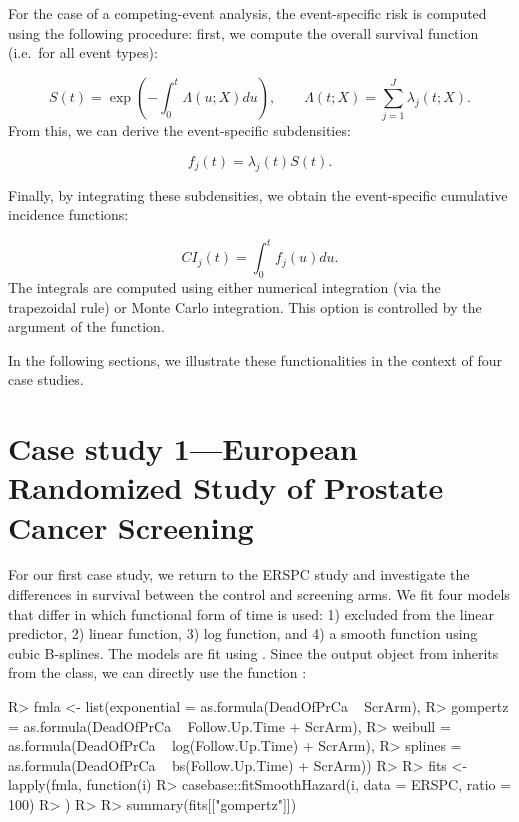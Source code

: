\documentclass[
]{jss}
\begin{document}
For the case of a competing-event analysis, the event-specific risk is
computed using the following procedure: first, we compute the overall
survival function (i.e.~for all event types):

\[ S(t) = \exp\left(-\int_0^t \Lambda(u;X) du\right),\qquad \Lambda(t;X) = \sum_{j=1}^J \lambda_j(t;X).\]
From this, we can derive the event-specific subdensities:

\[ f_j(t) = \lambda_j(t)S(t).\]

Finally, by integrating these subdensities, we obtain the event-specific
cumulative incidence functions:

\[ CI_j(t) = \int_0^t f_j(u)du.\] The integrals are computed using
either numerical integration (via the trapezoidal rule) or Monte Carlo
integration. This option is controlled by the argument  of
the  function.

In the following sections, we illustrate these functionalities in the
context of four case studies.

\hypertarget{case-study-1european-randomized-study-of-prostate-cancer-screening}{%
\section{Case study 1---European Randomized Study of Prostate Cancer
Screening}\label{case-study-1european-randomized-study-of-prostate-cancer-screening}}

For our first case study, we return to the ERSPC study and investigate
the differences in survival between the control and screening arms. We
fit four models that differ in which functional form of time is used: 1)
excluded from the linear predictor, 2) linear function, 3) log function,
and 4) a smooth function using cubic B-splines. The models are fit using
. Since the output object from
 inherits from the  class, we can
directly use the function :

\begin{CodeChunk}

\begin{CodeInput}
R> fmla <- list(exponential = as.formula(DeadOfPrCa ~ ScrArm),
R>              gompertz = as.formula(DeadOfPrCa ~ Follow.Up.Time + ScrArm),
R>              weibull = as.formula(DeadOfPrCa ~ log(Follow.Up.Time) + ScrArm),
R>              splines = as.formula(DeadOfPrCa ~ bs(Follow.Up.Time) + ScrArm))
R> 
R> fits <- lapply(fmla, function(i) {
R>   casebase::fitSmoothHazard(i, data = ERSPC, ratio = 100)
R> })
R> 
R> summary(fits[["gompertz"]])
\end{CodeInput}
\end{CodeChunk}
\end{document}
